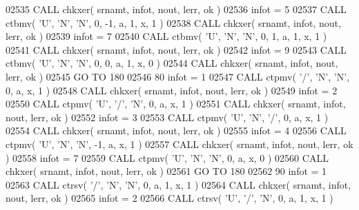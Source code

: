 \begin{DoxyCode}
02535       \textcolor{keyword}{CALL }chkxer( srnamt, infot, nout, lerr, ok )
02536       infot = 5
02537       \textcolor{keyword}{CALL }ctbmv( \textcolor{stringliteral}{'U'}, \textcolor{stringliteral}{'N'}, \textcolor{stringliteral}{'N'}, 0, -1, a, 1, x, 1 )
02538       \textcolor{keyword}{CALL }chkxer( srnamt, infot, nout, lerr, ok )
02539       infot = 7
02540       \textcolor{keyword}{CALL }ctbmv( \textcolor{stringliteral}{'U'}, \textcolor{stringliteral}{'N'}, \textcolor{stringliteral}{'N'}, 0, 1, a, 1, x, 1 )
02541       \textcolor{keyword}{CALL }chkxer( srnamt, infot, nout, lerr, ok )
02542       infot = 9
02543       \textcolor{keyword}{CALL }ctbmv( \textcolor{stringliteral}{'U'}, \textcolor{stringliteral}{'N'}, \textcolor{stringliteral}{'N'}, 0, 0, a, 1, x, 0 )
02544       \textcolor{keyword}{CALL }chkxer( srnamt, infot, nout, lerr, ok )
02545       \textcolor{keywordflow}{GO TO} 180
02546    80 infot = 1
02547       \textcolor{keyword}{CALL }ctpmv( \textcolor{stringliteral}{'/'}, \textcolor{stringliteral}{'N'}, \textcolor{stringliteral}{'N'}, 0, a, x, 1 )
02548       \textcolor{keyword}{CALL }chkxer( srnamt, infot, nout, lerr, ok )
02549       infot = 2
02550       \textcolor{keyword}{CALL }ctpmv( \textcolor{stringliteral}{'U'}, \textcolor{stringliteral}{'/'}, \textcolor{stringliteral}{'N'}, 0, a, x, 1 )
02551       \textcolor{keyword}{CALL }chkxer( srnamt, infot, nout, lerr, ok )
02552       infot = 3
02553       \textcolor{keyword}{CALL }ctpmv( \textcolor{stringliteral}{'U'}, \textcolor{stringliteral}{'N'}, \textcolor{stringliteral}{'/'}, 0, a, x, 1 )
02554       \textcolor{keyword}{CALL }chkxer( srnamt, infot, nout, lerr, ok )
02555       infot = 4
02556       \textcolor{keyword}{CALL }ctpmv( \textcolor{stringliteral}{'U'}, \textcolor{stringliteral}{'N'}, \textcolor{stringliteral}{'N'}, -1, a, x, 1 )
02557       \textcolor{keyword}{CALL }chkxer( srnamt, infot, nout, lerr, ok )
02558       infot = 7
02559       \textcolor{keyword}{CALL }ctpmv( \textcolor{stringliteral}{'U'}, \textcolor{stringliteral}{'N'}, \textcolor{stringliteral}{'N'}, 0, a, x, 0 )
02560       \textcolor{keyword}{CALL }chkxer( srnamt, infot, nout, lerr, ok )
02561       \textcolor{keywordflow}{GO TO} 180
02562    90 infot = 1
02563       \textcolor{keyword}{CALL }ctrsv( \textcolor{stringliteral}{'/'}, \textcolor{stringliteral}{'N'}, \textcolor{stringliteral}{'N'}, 0, a, 1, x, 1 )
02564       \textcolor{keyword}{CALL }chkxer( srnamt, infot, nout, lerr, ok )
02565       infot = 2
02566       \textcolor{keyword}{CALL }ctrsv( \textcolor{stringliteral}{'U'}, \textcolor{stringliteral}{'/'}, \textcolor{stringliteral}{'N'}, 0, a, 1, x, 1 )

\end{DoxyCode}
